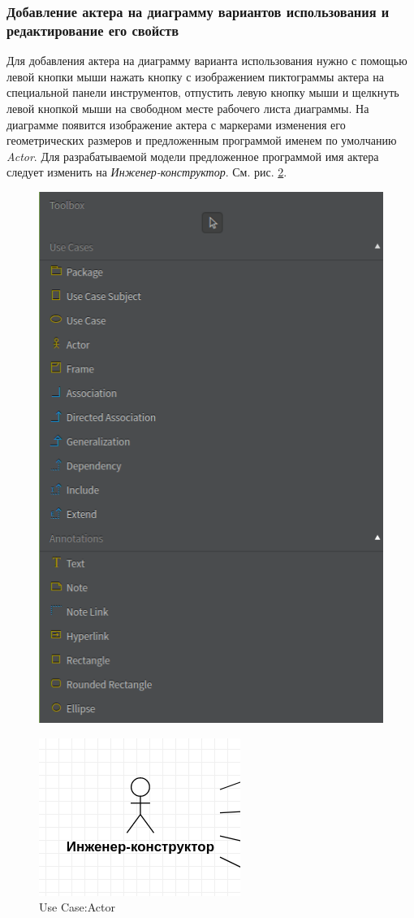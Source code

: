 \documentclass[a4paper,12pt]{report}
\begin{document}
\subsubsection*{Добавление актера на диаграмму вариантов использования и редактирование его свойств}
Для добавления актера на диаграмму варианта использования нужно с помощью левой кнопки мыши нажать кнопку с изображением пиктограммы актера на специальной панели инструментов, отпустить левую кнопку мыши и щелкнуть левой кнопкой мыши на свободном месте рабочего листа диаграммы. На диаграмме появится изображение актера с маркерами изменения его геометрических размеров и предложенным программой именем по умолчанию \textit{Actor}. Для разрабатываемой модели предложенное программой имя актера следует изменить на \textit{Инженер-конструктор}. См. рис. \ref{fig:actor1}.
\begin{figure}[htbp]
	\centering
	\includegraphics[width=0.4\linewidth]{images/toolboxusecase}
	\caption{}
	\label{fig:toolboxusecase}
\end{figure}
\begin{figure}
	\centering
	\includegraphics[width=0.3\linewidth]{images/actor1}
	\caption{Use Case:Actor}
	\label{fig:actor1}
\end{figure}
\end{document}
